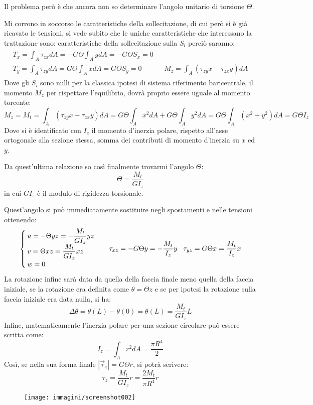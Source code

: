 \documentclass{article}
\begin{document}
\begin{adjustwidth}{2in}{}
			Il problema però è che ancora non so determinare l'angolo unitario di torsione $\Theta$. 
			
			Mi corrono in soccorso le caratteristiche della sollecitazione, di cui però si è già ricavato le tensioni, si vede subito che le uniche caratteristiche che interessano la trattazione sono: 
			caratteristiche della sollecitazione sulla $S_l$ perciò saranno:
			\[\begin{matrix}
				\begin{aligned}
					T_x = \int_A \tau_{zx}dA = -G\Theta\int_AydA = -G\Theta S_x = 0 &  \\
					T_y = \int_A \tau_{zy}dA = G\Theta\int_AxdA = G\Theta S_y =0 \hspace{1cm} &  M_z = \int_A (\tau_{zy}x -\tau_{zx}y)dA
				\end{aligned}	
			\end{matrix}\]
			Dove gli $S_i$ sono nulli per la classica ipotesi di sistema riferimento baricentrale, il momento $M_z$ per rispettare l'equilibrio, dovrà proprio essere uguale al momento torcente:
			\[ M_z = M_t = \int_A (\tau_{zy}x -\tau_{zx}y)dA = G\Theta\int_Ax^2dA + G\Theta\int_Ay^2dA = G\Theta\int_A(x^2 + y^2)dA = G\Theta I_z \]
			Dove si è identificato con $I_z$ il momento d'inerzia polare, rispetto all'asse ortogonale alla sezione stessa, somma dei contributi di momento d'inerzia su $x$ ed $y$. \newline
			
			Da quest'ultima relazione so così finalmente trovarmi l'angolo $\Theta$: 
			\[ \Theta = \dfrac{M_t}{GI_z}\]
			in cui $GI_z$ è il modulo di rigidezza torsionale. \newline 
			
			Quest'angolo si può immediatamente sostituire negli spostamenti e nelle tensioni ottenendo: 
			\[ \begin{cases}
				u = -\Theta yz = -\dfrac{M_t}{GI_z}yz \\
				v =  \Theta xz = \dfrac{M_t}{GI_z} xz\\
				w = 0
			\end{cases} \hspace{0.3cm} \tau_{xz} = -G\Theta y = -\dfrac{M_t}{I_z}y  \hspace{0.3cm} \tau_{yz} = G\Theta x = \dfrac{M_t}{I_z}x\]
			La rotazione infine sarà data da quella della faccia finale meno quella della faccia iniziale, se la rotazione era definita come $\theta = \Theta z$ e se per ipotesi la rotazione sulla faccia iniziale era data nulla, si ha: 
			\[\Delta\theta = \theta(L) - \theta(0) = \theta(L) = \dfrac{M_t}{GI_z}L\]
			Infine, matematicamente l'inerzia polare per una sezione circolare può essere scritta come: 
			\[ I_z = \int_A r^2dA = \dfrac{\pi R^4}{2}\]
			Così, se nella sua forma finale $|\vec{\tau}_z| = G\Theta r$, si potrà scrivere:
			\[ \boxed{\tau_z = \dfrac{M_t}{GI_z}r = \dfrac{2M_t}{\pi R^4}r} \]
			\begin{figure}[H]
				\centering
				\texttt{[image: immagini/screenshot002]}
				\label{fig:screenshot002}
			\end{figure}
			

\end{adjustwidth}
\end{document}

